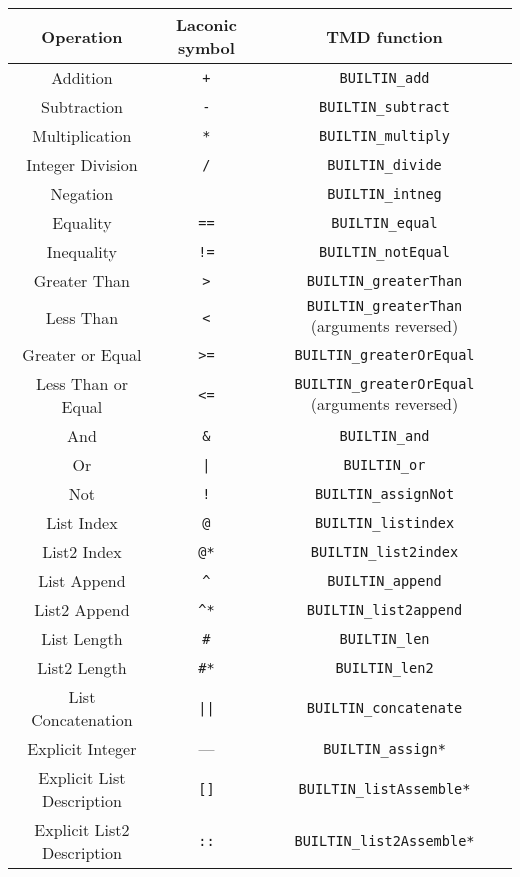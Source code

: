 \documentclass[11pt]{article}
\begin{document}
\begin{center}
    \begin{centering}
    \begin{tabular}{||c c c||}
    \hline
    Operation & Laconic symbol & TMD function \\ [0.5ex]
    \hline
    Addition & \texttt{+} & \texttt{BUILTIN_add} \\
    \hline
    Subtraction & \texttt{-} & \texttt{BUILTIN_subtract} \\
    \hline
    Multiplication & \texttt{*} & \texttt{BUILTIN_multiply}\\
    \hline
    Integer Division & \texttt{/} & \texttt{BUILTIN_divide}\\
    \hline
    Negation & \texttt{~} & \texttt{BUILTIN_intneg}\\
    \hline
    Equality & \texttt{==} & \texttt{BUILTIN_equal}\\
    \hline
    Inequality & \texttt{!=} & \texttt{BUILTIN_notEqual}\\
    \hline
    Greater Than & \texttt{>} & \texttt{BUILTIN_greaterThan}\\
    \hline
    Less Than & \texttt{<} & \texttt{BUILTIN_greaterThan} (arguments reversed)\\
    \hline
    Greater or Equal & \texttt{>=} & \texttt{BUILTIN_greaterOrEqual}\\
    \hline
    Less Than or Equal & \texttt{<=} & \texttt{BUILTIN_greaterOrEqual} (arguments reversed)\\
    \hline
    And & \texttt{\&} & \texttt{BUILTIN_and}\\
    \hline
    Or & \texttt{|} & \texttt{BUILTIN_or}\\
    \hline
    Not & \texttt{!} & \texttt{BUILTIN_assignNot}\\
    \hline
    List Index & \texttt{@} & \texttt{BUILTIN_listindex}\\
    \hline
    List2 Index & \texttt{@*} & \texttt{BUILTIN_list2index}\\
    \hline
    List Append & \texttt{\^} & \texttt{BUILTIN_append}\\
    \hline
    List2 Append & \texttt{\^{}*} & \texttt{BUILTIN_list2append}\\
    \hline
    List Length & \texttt{\#} & \texttt{BUILTIN_len}\\
    \hline
    List2 Length & \texttt{\#*} & \texttt{BUILTIN_len2}\\
    \hline
    List Concatenation & \texttt{||} & \texttt{BUILTIN_concatenate}\\
    \hline
    Explicit Integer & --- & \texttt{BUILTIN_assign*}\\
    \hline
    Explicit List Description & \texttt{[]} & \texttt{BUILTIN_listAssemble*}\\
    \hline 
    Explicit List2 Description & \texttt{::} & \texttt{BUILTIN_list2Assemble*}\\
    \end{tabular}
    \end{centering}
\end{center}
\end{document}
